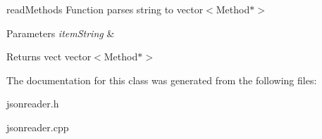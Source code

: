 read\-Methods \-Function parses string to vector$<$\-Method$\ast$$>$ 


\begin{DoxyParams}{\-Parameters}
{\em item\-String} & \\
\hline
\end{DoxyParams}
\begin{DoxyReturn}{\-Returns}
vect vector$<$\-Method$\ast$$>$ 
\end{DoxyReturn}


\-The documentation for this class was generated from the following files\-:\begin{DoxyCompactItemize}
\item 
jsonreader.\-h\item 
jsonreader.\-cpp\end{DoxyCompactItemize}
